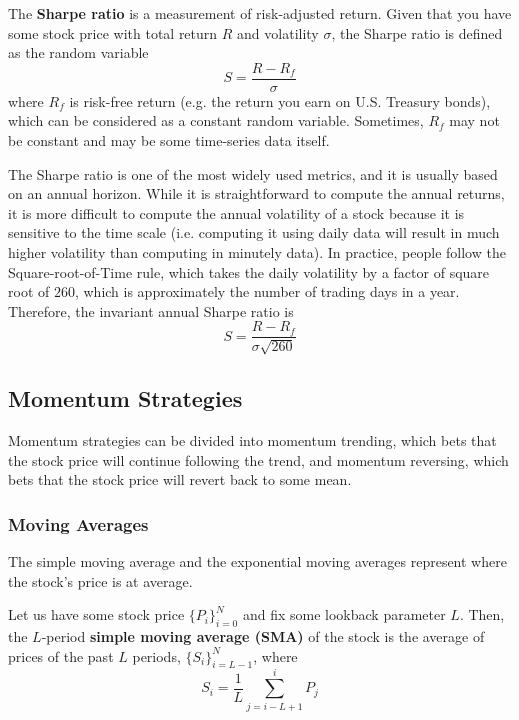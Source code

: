 \documentclass{article}
\begin{document}
    \begin{definition}
      The \textbf{Sharpe ratio} is a measurement of risk-adjusted return. Given that you have some stock price with total return $R$ and volatility $\sigma$, the Sharpe ratio is defined as the random variable
      \[S = \frac{R - R_f}{\sigma}\]
      where $R_f$ is risk-free return (e.g. the return you earn on U.S. Treasury bonds), which can be considered as a constant random variable. Sometimes, $R_f$ may not be constant and may be some time-series data itself. 
    \end{definition}

    The Sharpe ratio is one of the most widely used metrics, and it is usually based on an annual horizon. While it is straightforward to compute the annual returns, it is more difficult to compute the annual volatility of a stock because it is sensitive to the time scale (i.e. computing it using daily data will result in much higher volatility than computing in minutely data). In practice, people follow the Square-root-of-Time rule, which takes the daily volatility by a factor of square root of $260$, which is approximately the number of trading days in a year. Therefore, the invariant annual Sharpe ratio is 
    \begin{equation}
      S = \frac{R - R_f}{\sigma \sqrt{260}}
    \end{equation}

  \subsection{Momentum Strategies}

    Momentum strategies can be divided into momentum trending, which bets that the stock price will continue following the trend, and momentum reversing, which bets that the stock price will revert back to some mean. 

    \subsubsection{Moving Averages}

      The simple moving average and the exponential moving averages represent where the stock's price is at average. 

      \begin{definition}
      Let us have some stock price $\{P_i\}_{i=0}^N$ and fix some lookback parameter $L$. Then, the $L$-period \textbf{simple moving average (SMA)} of the stock is the average of prices of the past $L$ periods, $\{S_i\}_{i=L-1}^N$, where 
      \[S_i = \frac{1}{L} \sum_{j=i-L + 1}^i P_j\]
      \end{definition}
\end{document}
